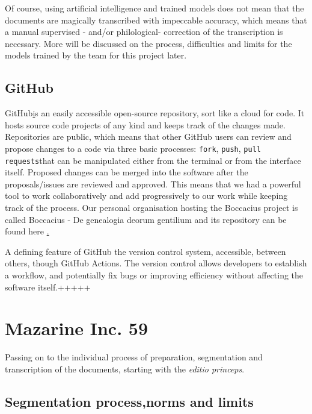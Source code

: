 \documentclass[12pt,twoside]{article}
\begin{document}
Of course, using artificial intelligence and trained models does not mean that the documents are magically transcribed with impeccable accuracy, which means that a manual supervised - and/or philological- correction of the transcription is necessary. More will be discussed on the process, difficulties and limits for the models trained by the team for this project later.


\subsection{GitHub}

GitHub\href{https://github.com/} is an easily accessible open-source repository, sort like a cloud for code. It hosts source code projects of any kind and keeps track of the changes made. Repositories are public, which means that other GitHub users can review and propose changes to a code via three basic processes: \texttt{fork}, \texttt{push}, \texttt{pull requests}that can be manipulated either from the terminal or from the interface itself. Proposed changes can be merged into the software after the proposals/issues are reviewed and approved. This means that we had a powerful tool to work collaboratively and add progressively to  our work while keeping track of the process. Our personal organisation hosting the Boccacius project is called Boccacius - De genealogia deorum gentilium and its repository can be found here \href{https://github.com/HN-2021-Boccacius/git-project-Boccace}.

A defining feature of GitHub the version control system, accessible, between others, though GitHub Actions. The version control allows developers to establish a workflow,  and potentially fix bugs or improving efficiency without affecting the software itself.+++++

\clearpage
\section{Mazarine Inc. 59}

Passing on to the individual process of preparation, segmentation and transcription of the documents, starting with the \textit{editio princeps}.

\subsection{Segmentation process,norms and limits}
\end{document}
